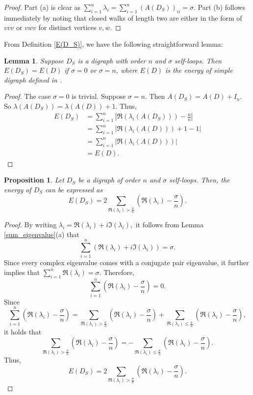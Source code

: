\documentclass[12pt,a4paper,reqno]{amsart}
\numberwithin{equation}{section}
\theoremstyle{plain}
\newtheorem{lemma}[theorem]{Lemma}
\newtheorem{proposition}[theorem]{Proposition}
\theoremstyle{definition}
\newcommand{\<}{\langle}
\renewcommand{\>}{\rangle}
\begin{document}
\begin{proof}
	Part (a) is clear as $\sum_{i=1}^n \lambda_i =  \sum_{i=1}^n (A(D_S))_{ii} = \sigma.$ Part (b) follows immediately by noting that closed walks of length two are either in the form of $vvv$ or $vwv$ for distinct vertices $v,w$. 
\end{proof}

From Definition \ref{E(D_S)}, we have the following straightforward lemma:
\begin{lemma}\label{lemma_E(D_S)=E(D)}
	 Suppose $D_S$ is a digraph with order $n$ and $\sigma$ self-loops. Then 
     $E(D_S)=E(D)$ if $\sigma=0$ or $\sigma=n$, where $E(D)$ is the energy of simple digraph defined in \cite{pena2008energy}.
\end{lemma}

\begin{proof}
		The case $\sigma=0$ is trivial. Suppose $\sigma=n$. Then $A(D_S)=A(D)+I_n$. So $\lambda(A(D_S))=\lambda(A(D))+1$. Thus,
		\begin{align*}
			E(D_S) &= \sum_{i=1}^n \left | \Re(\lambda_i(A(D_S)))-\frac{n}{n} \right|\\           
			&= \sum_{i=1}^n \left | \Re(\lambda_i(A(D)))+1-1 \right| \\        
			&= \sum_{i=1}^n \left | \Re(\lambda_i(A(D))) \right| \\            
			&= E(D).
		\end{align*}
		
\end{proof}

\begin{proposition}\label{energy+}
Let $D_S$ be a digraph of order $n$ and $\sigma$ self-loops. Then, the energy of $D_S$ can be expressed as
    \begin{equation}\label{eq_energy_2_times}
    E(D_S) = 2\sum_{\Re(\lambda_i)> \frac{\sigma}{n}} \left( \Re(\lambda_i)-\frac{\sigma}{n} \right).
    \end{equation}


\end{proposition}

\begin{proof}
By writing $\lambda_i= \Re(\lambda_i) + i \Im(\lambda_i),$  it follows from Lemma \ref{sum_eigenvalue}(a) that 
\[
\sum^n_{i=1} \left(\Re(\lambda_i)+i\Im(\lambda_i) \right)= \sigma.
\]
Since every complex eigenvalue comes with a conjugate pair eigenvalue, it further implies that $\sum^n_{i=1} \Re(\lambda_i)=\sigma.$ Therefore, 
\[
\sum_{i=1}^n \left( \Re(\lambda_i) - \frac{\sigma}{n} \right)=0.
\]
Since 
\[
\sum_{i=1}^n \left( \Re(\lambda_i) - \frac{\sigma}{n} \right) 
=	\sum_{\Re(\lambda_i)> \frac{\sigma}{n}} \left( \Re(\lambda_i)-\frac{\sigma}{n} \right) + \sum_{\Re(\lambda_i) \leq \frac{\sigma}{n}} \left( \Re(\lambda_i)-\frac{\sigma}{n} \right),
\]
it holds that
\[
\sum_{\Re(\lambda_i)> \frac{\sigma}{n}} \left( \Re(\lambda_i)-\frac{\sigma}{n} \right) = - \sum_{\Re(\lambda_i) \leq \frac{\sigma}{n}} \left( \Re(\lambda_i)-\frac{\sigma}{n} \right).
\]
Thus, 
\[
E(D_S) = 2\sum_{\Re(\lambda_i)> \frac{\sigma}{n}} \left( \Re(\lambda_i)-\frac{\sigma}{n} \right).
\]
\end{proof}
		
\end{document}
